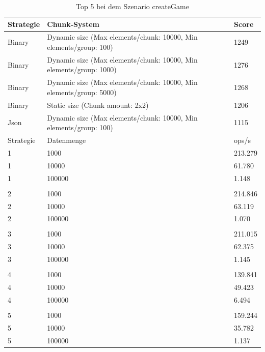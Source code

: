 \begin{table}[htp]
    \centering
    \caption{Top 5 bei dem Szenario createGame}
    \begin{tabular}{|l|l|l|}
    \hline
        Strategie & Chunk-System & Score \\
        \hline
        Binary & Dynamic size (Max elements/chunk: 10000, Min elements/group: 100) & 1249\\
        Binary & Dynamic size (Max elements/chunk: 10000, Min elements/group: 1000) & 1276\\
        Binary & Dynamic size (Max elements/chunk: 10000, Min elements/group: 5000) & 1268\\
        Binary & Static size (Chunk amount: 2x2) & 1206\\
        Json & Dynamic size (Max elements/chunk: 10000, Min elements/group: 100) & 1115\\
        \hline
        Strategie & Datenmenge & ops/s \\
        \hline
        1 & 1000 & 213.279\\
        1 & 10000 & 61.780\\
        1 & 100000 & 1.148\\
        & & \\
        2 & 1000 & 214.846\\
        2 & 10000 & 63.119\\
        2 & 100000 & 1.070\\
        & & \\
        3 & 1000 & 211.015\\
        3 & 10000 & 62.375\\
        3 & 100000 & 1.145\\
        & & \\
        4 & 1000 & 139.841\\
        4 & 10000 & 49.423\\
        4 & 100000 & 6.494\\
        & & \\
        5 & 1000 & 159.244\\
        5 & 10000 & 35.782\\
        5 & 100000 & 1.137\\
        \hline
    \end{tabular}
    \label{tbl:createGame}
\end{table}

